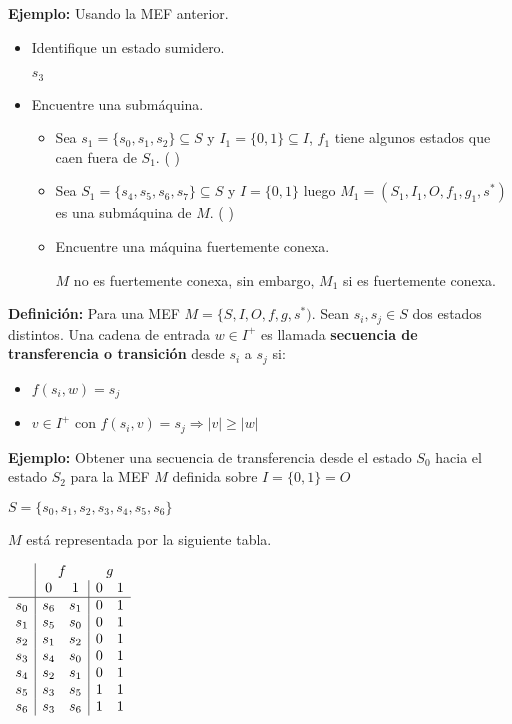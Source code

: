 \begin{enumerate}
\textbf{Ejemplo: }Usando la MEF anterior.

\begin{itemize}
\item Identifique un estado sumidero.

	$s_3$
\item Encuentre una submáquina.
\begin{itemize}
	\item Sea $s_1=\{s_0,s_1,s_2\}\subseteq S$ y $I_1=\{0,1\}\subseteq I$, 
	$f_1$ tiene algunos estados que caen fuera de $S_1$. ( \xmark )
	
	\item Sea $S_1=\{s_4,s_5,s_6,s_7\}\subseteq S$ y $I=\{0,1\}$ luego $M_1=(S_1,I_1,O,f_1,g_1,s^*)$ es una submáquina de $M$. ( \cmark )
	\item Encuentre una máquina fuertemente conexa.
	
	$M$ no es fuertemente conexa, sin embargo, $M_1$ si es fuertemente conexa.
	
\end{itemize}
\end{itemize}
	

\end{enumerate}

\textbf{Definición: }Para una MEF $M=\{S,I,O,f,g,s^*)$. Sean $s_i,s_j \in S$ dos estados distintos. Una cadena de entrada $w\in I^+$ es llamada \textbf{secuencia de transferencia o transición} desde $s_i$ a $s_j$ si:
\begin{itemize}
\item $f(s_i,w)=s_j$
\item $v\in I^+$ con $f(s_i,v)=s_j\Rightarrow |v|\geq |w|$
\end{itemize}

\textbf{Ejemplo: }Obtener una secuencia de transferencia desde el estado $S_0$ hacia el estado $S_2$ para la MEF $M$ definida sobre $I=\{0,1\}=O$

$S=\{s_0,s_1,s_2,s_3,s_4,s_5,s_6\}$

$M$ está representada por la siguiente tabla.

\begin{center}
$\begin{array}{c|cc|cc}
	&	\multicolumn{2}{c}{f}	&\multicolumn{2}{c}{g}\\
	&0	&1	&0	&1	\\ \hline
s_0	&	s_6		&s_1	&0	&1	\\
s_1	&	s_5		&s_0	&0	&1	\\
s_2	&	s_1		&s_2	&0	&1	\\
s_3	&	s_4		&s_0	&0	&1	\\
s_4	&	s_2		&s_1	&0	&1	\\
s_5	&	s_3		&s_5	&1	&1	\\
s_6	&	s_3		&s_6	&1	&1	\\
\end{array}$
\end{center}

